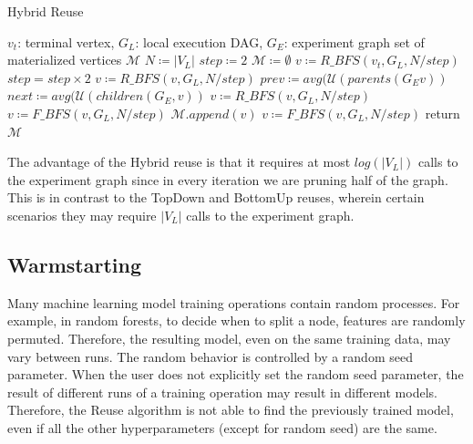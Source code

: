 \begin{algorithm}[h]
\caption{Hybrid Reuse}\label{algorithm-hybrid}
\begin{algorithmic}[1]
\Require $v_t$: terminal vertex, $G_L$: local execution DAG, $G_E$: experiment graph
\Ensure set of materialized vertices $\mathcal{M}$ 
\State $N \coloneqq |V_L|$
\State $step \coloneqq 2$
\State $\mathcal{M} \coloneqq \emptyset$
\State $v \coloneqq R\_BFS(v_t, G_L, N/step)$
		\State $step = step \times 2$
				\State $v \coloneqq R\_BFS(v, G_L, N/step)$
				\State $prev \coloneqq avg (\mathcal{U}(parents(G_E v))$
				\State $next \coloneqq avg (\mathcal{U}(children(G_E, v))$
						 \State $v \coloneqq R\_BFS(v, G_L, N/step)$
				\Else
					\State $v \coloneqq F\_BFS(v, G_L, N/step)$
				\EndIf
				\State $\mathcal{M}.append(v)$
				\State $v \coloneqq F\_BFS(v, G_L, N/step)$
		\EndIf
\EndWhile
\State return $\mathcal{M}$
\end{algorithmic}
\end{algorithm}
The advantage of the Hybrid reuse is that it requires at most $log(|V_L|)$ calls to the experiment graph since in every iteration we are pruning half of the graph.
This is in contrast to the TopDown and BottomUp reuses, wherein certain scenarios they may require $|V_L|$ calls to the experiment graph.

\subsection{Warmstarting}
Many machine learning model training operations contain random processes.
For example, in random forests, to decide when to split a node, features are randomly permuted.
Therefore, the resulting model, even on the same training data, may vary between runs.
The random behavior is controlled by a random seed parameter.
When the user does not explicitly set the random seed parameter, the result of different runs of a training operation may result in different models.
Therefore, the Reuse algorithm is not able to find the previously trained model, even if all the other hyperparameters (except for random seed) are the same.

